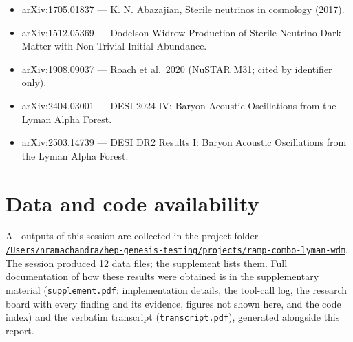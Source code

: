 \documentclass[11pt,a4paper]{article}
\begin{document}
\begin{itemize}
\item arXiv:1705.01837 --- K. N. Abazajian, Sterile neutrinos in cosmology (2017).
\item arXiv:1512.05369 --- Dodelson-Widrow Production of Sterile Neutrino Dark Matter with Non-Trivial Initial Abundance.
\item arXiv:1908.09037 --- Roach et al.\ 2020 (NuSTAR M31; cited by identifier only).
\item arXiv:2404.03001 --- DESI 2024 IV: Baryon Acoustic Oscillations from the Lyman Alpha Forest.
\item arXiv:2503.14739 --- DESI DR2 Results I: Baryon Acoustic Oscillations from the Lyman Alpha Forest.
\end{itemize}

\section*{Data and code availability}
All outputs of this session are collected in the project folder \href{file:///Users/nramachandra/hep-genesis-testing/projects/ramp-combo-lyman-wdm}{\texttt{/\allowbreak{}Users/\allowbreak{}nramachandra/\allowbreak{}hep-genesis-testing/\allowbreak{}projects/\allowbreak{}ramp-combo-lyman-wdm}}.
The session produced 12 data files; the supplement lists them.
Full documentation of how these results were obtained is in the supplementary material (\texttt{supplement.pdf}: implementation details, the tool-call log, the research board with every finding and its evidence, figures not shown here, and the code index) and the verbatim transcript (\texttt{transcript.pdf}), generated alongside this report.
\end{document}
